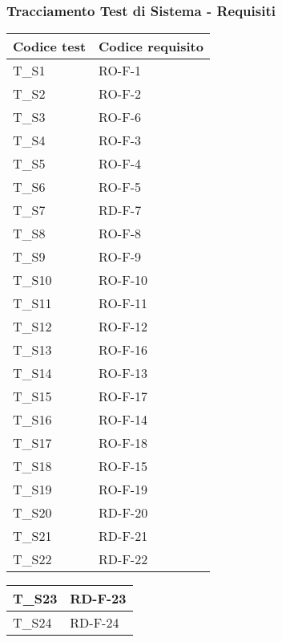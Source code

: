 \subsubsection{Tracciamento Test di Sistema - Requisiti}
\begin{center}
    \renewcommand{\arraystretch}{1.8}
    \begin{tabular}{|m{6em}|m{8em}|}
        \hline
        \textbf{Codice test} & \textbf{Codice requisito}\\
        \hline
        T\_S1 & RO-F-1\\
        \hline
        T\_S2 & RO-F-2\\
        \hline
        T\_S3 & RO-F-6\\
        \hline
        T\_S4 & RO-F-3\\
        \hline
        T\_S5 & RO-F-4\\
        \hline
        T\_S6 & RO-F-5\\
        \hline
        T\_S7 & RD-F-7\\
        \hline
        T\_S8 & RO-F-8\\
        \hline
        T\_S9 & RO-F-9\\
        \hline
        T\_S10 & RO-F-10\\
        \hline
        T\_S11 & RO-F-11\\
        \hline
        T\_S12 & RO-F-12\\
        \hline
        T\_S13 & RO-F-16\\
        \hline
        T\_S14 & RO-F-13\\
        \hline
        T\_S15 & RO-F-17\\
        \hline
        T\_S16 & RO-F-14\\
        \hline
        T\_S17 & RO-F-18\\
        \hline
        T\_S18 & RO-F-15\\
        \hline
        T\_S19 & RO-F-19\\
        \hline
        T\_S20 & RD-F-20\\
        \hline
        T\_S21 & RD-F-21\\
        \hline
        T\_S22 & RD-F-22\\
        \hline
    \end{tabular}
    \newpage
    \renewcommand{\arraystretch}{1.8}
    \begin{tabular}{|m{6em}|m{8em}|}
        \hline
        T\_S23 & RD-F-23\\
        \hline
        T\_S24 & RD-F-24\\

\end{tabular}
\end{center}
